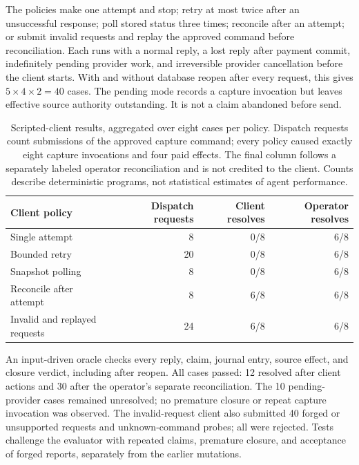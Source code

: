 \documentclass[11pt]{article}
\begin{document}
The policies make one attempt and stop; retry at most twice after an unsuccessful
response; poll stored status three times; reconcile after an attempt; or submit
invalid requests and replay the approved command before reconciliation.
Each runs with a normal reply, a lost reply after payment commit, indefinitely
pending provider work, and irreversible provider cancellation before the client
starts. With and without database reopen after every request, this gives
$5\times4\times2=40$ cases. The pending mode records a capture invocation but
leaves effective source authority outstanding. It is not a claim abandoned
before send.

\begin{table}[ht]
\centering\small
\begin{tabularx}{\linewidth}{@{}>{\raggedright\arraybackslash}X r r r@{}}
\toprule
Client policy & Dispatch requests & Client resolves & Operator resolves \\
\midrule
Single attempt & 8 & 0/8 & 6/8 \\
Bounded retry & 20 & 0/8 & 6/8 \\
Snapshot polling & 8 & 0/8 & 6/8 \\
Reconcile after attempt & 8 & 6/8 & 6/8 \\
Invalid and replayed requests & 24 & 6/8 & 6/8 \\
\bottomrule
\end{tabularx}
\caption{Scripted-client results, aggregated over eight cases per policy.
Dispatch requests count submissions of the approved capture command; every
policy caused exactly eight capture invocations and four paid effects.
The final column follows a separately labeled operator reconciliation and is
not credited to the client. Counts describe deterministic programs, not
statistical estimates of agent performance.}
\label{tab:agents}
\end{table}

An input-driven oracle checks every reply, claim, journal entry, source effect,
and closure verdict, including after reopen. All cases passed: 12 resolved
after client actions and 30 after the operator's separate reconciliation.
The 10 pending-provider cases remained unresolved; no premature closure or
repeat capture invocation was observed. The invalid-request client also
submitted 40 forged or unsupported requests and unknown-command probes; all
were rejected. Tests challenge the evaluator with repeated claims, premature
closure, and acceptance of forged reports, separately from the earlier mutations.
\end{document}
